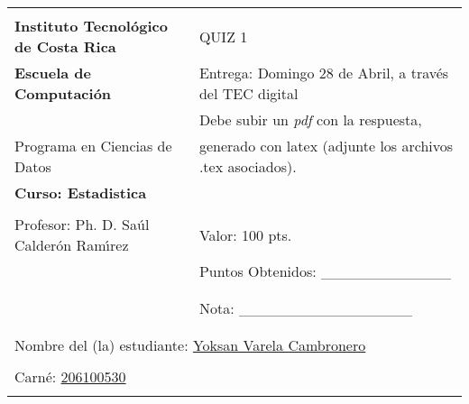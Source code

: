\documentclass[english]{article}
\providecommand{\tabularnewline}{\\}
\begin{document}
\begin{flushleft}
\begin{tabular}{|l|l|}
\hline 
 & \tabularnewline
\textbf{\large{}Instituto Tecnol\'{o}gico de Costa Rica} & QUIZ 1\tabularnewline
\textbf{\large{}Escuela de Computaci\'{o}n} & Entrega: Domingo 28 de Abril, a trav\'{e}s del TEC digital\tabularnewline
 & Debe subir un \emph{pdf }con la respuesta,\tabularnewline
Programa en Ciencias de Datos & generado con latex (adjunte los archivos .tex asociados).\tabularnewline
\textbf{Curso: Estadistica} & \tabularnewline
 & \tabularnewline
Profesor: Ph. D. Sa\'{u}l Calder\'{o}n Ram\'{\i}rez & Valor: 100 pts.\tabularnewline
 & Puntos Obtenidos: \_\_\_\_\_\_\_\_\_\_\_\_\tabularnewline
 & \tabularnewline
 & \tabularnewline
 & Nota: \_\_\_\_\_\_\_\_\_\_\_\_\_\_\_\_\tabularnewline
 & \tabularnewline
\cline{2-2} 
\multicolumn{2}{|c|}{}\tabularnewline
\multicolumn{2}{|l|}{Nombre del (la) estudiante: \underline{Yoksan Varela Cambronero}}\tabularnewline
\multicolumn{1}{|l}{} & \tabularnewline
\multicolumn{1}{|l}{Carn\'{e}: \underline{206100530}} & \tabularnewline
\multicolumn{1}{|l}{} & \tabularnewline
\hline 
\end{tabular}
\par\end{flushleft}
\end{document}
